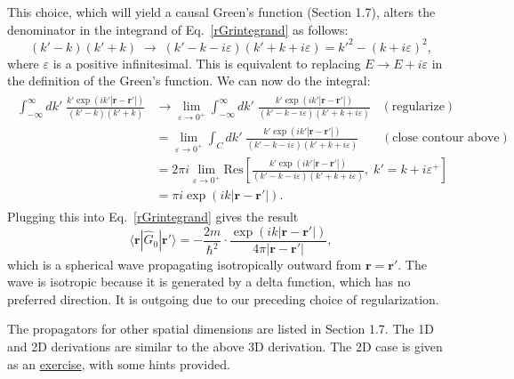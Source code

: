 \documentclass[pra,12pt]{revtex4}
\begin{document}
\noindent
This choice, which will yield a causal Green's function (Section 1.7),
alters the denominator in the integrand of Eq.~\eqref{rGrintegrand} as
follows:
\begin{equation}
  (k' - k)(k'+k) \;\rightarrow\; (k' - k - i\varepsilon)(k'+k+i\varepsilon) = {k'}^2 - (k+i\varepsilon)^2,
\end{equation}
where $\varepsilon$ is a positive infinitesimal.  This is equivalent
to replacing $E \rightarrow E + i\varepsilon$ in the definition of the
Green's function.  We can now do the integral:
\begin{align*}
  \begin{aligned}\int_{-\infty}^\infty dk' \; \frac{\displaystyle k' \exp\left(ik'|\mathbf{r}-\mathbf{r}'|\right)}{(k' - k)(k'+k)} &\rightarrow \lim_{\varepsilon \rightarrow 0^+} \int_{-\infty}^\infty dk' \; \frac{\displaystyle k' \exp\left(ik'|\mathbf{r}-\mathbf{r}'|\right)}{(k' - k - i\varepsilon)(k'+k+i\varepsilon)}\;\;\; (\text{regularize}) \\ &= \lim_{\varepsilon \rightarrow 0^+} \int_C dk' \; \frac{\displaystyle k' \exp\left(ik'|\mathbf{r}-\mathbf{r}'|\right)}{(k' - k - i\varepsilon)(k'+k+i\varepsilon)} \quad\;\;\; (\text{close contour above}) \\ &= 2\pi i \lim_{\varepsilon \rightarrow 0^+} \mathrm{Res}\left[\frac{\displaystyle k' \exp\left(ik'|\mathbf{r}-\mathbf{r}'|\right)}{(k' - k - i\varepsilon)(k'+k+i\varepsilon)}, \;k'=k+i\varepsilon^+\right] \\ &= \pi i \exp\left(ik|\mathbf{r}-\mathbf{r}'|\right).\end{aligned}
\end{align*}
Plugging this into Eq.~\eqref{rGrintegrand} gives the result
\begin{equation}
  \langle\mathbf{r}|\hat{G}_0|\mathbf{r}'\rangle = -\frac{2m}{\hbar^2}
  \cdot \frac{\exp\left(ik|\mathbf{r}-\mathbf{r}'|\right)}{4\pi|\mathbf{r}-\mathbf{r}'|},
\end{equation}
which is a spherical wave propagating isotropically outward from
$\mathbf{r} = \mathbf{r}'$.  The wave is isotropic because it is
generated by a delta function, which has no preferred direction.  It
is outgoing due to our preceding choice of regularization.

The propagators for other spatial dimensions are listed in Section
1.7.  The 1D and 2D derivations are similar to the above 3D
derivation.  The 2D case is given as an
\hyperref[ex:2dpropagator]{exercise}, with some hints provided.
\end{document}
